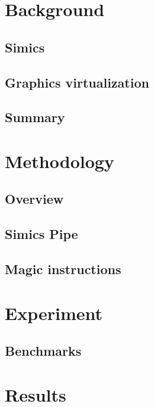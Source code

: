 \documentclass{beamer}
\begin{document}
	

	\section{Background}
	\subsection{Simics}
	
	\subsection{Graphics virtualization}
	
	\subsection{Summary}
	

	\section{Methodology}
	\subsection{Overview}
	
	\subsection{Simics Pipe}
	
	\subsection{Magic instructions}
	

	\section{Experiment}
	\subsection{Benchmarks}
	

	\section{Results}
\end{document}

